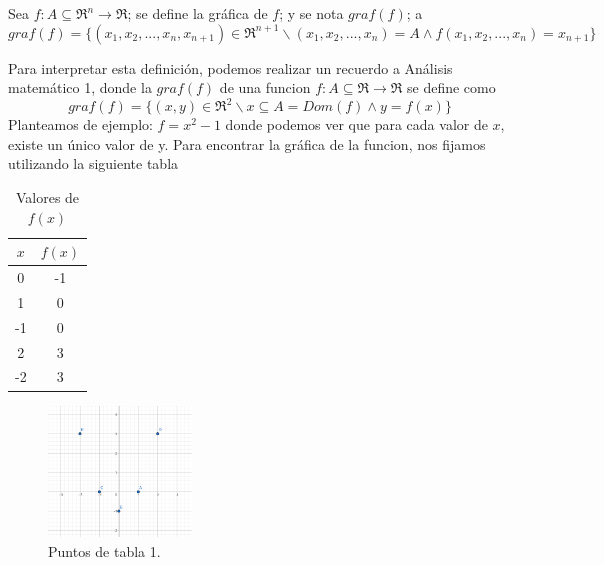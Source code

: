 
\begin{definition} [Grafica de $f$] 
\label{def:grafica}
 \mbox{}
 
Sea $f: A\subseteq\Re^n\rightarrow\Re$; se define la gráfica de $f$; y se nota $graf(f)$; a
 \[
graf(f)=\{(x_1,x_2,...,x_n,x_{n+1})\in\Re^{n+1} \backslash (x_1,x_2,...,x_n)=A \land f(x_1,x_2,...,x_n)=x_{n+1} \}
 \]

Para interpretar esta definición, podemos realizar un recuerdo a Análisis matemático 1, donde la $graf (f)$ de una funcion $f: A\subseteq\Re\rightarrow\Re$ se define como
 \[
graf(f)=\{(x,y)\in\Re^2 \backslash x\subseteq A=Dom(f) \land y=f(x) \}
 \]
Planteamos de ejemplo: $f=x^2-1$ donde podemos ver que para cada valor de $x$, existe un único valor de y. Para encontrar la gráfica de la funcion, nos fijamos utilizando la siguiente tabla
\begin{table}[h!]
\centering
\begin{tabular}{|c|c|}
\hline
\textbf{$x$} & \textbf{$f(x)$}  \\ \hline
0             & -1                         \\ \hline
1             & 0                        \\ \hline
-1             & 0                          \\ \hline
2             & 3                          \\ \hline
-2             & 3                          \\ \hline
\end{tabular}
\caption{Valores de $f(x)$}
\label{tabla1}
\end{table}
\begin{figure}[h!] %
    \centering
    \includegraphics[width=0.34\textwidth]{../figs/Puntos_grafica.png} %
    \caption{Puntos de tabla 1.}
    \label{fig:ejemplo} %
\end{figure}



\end{definition}

